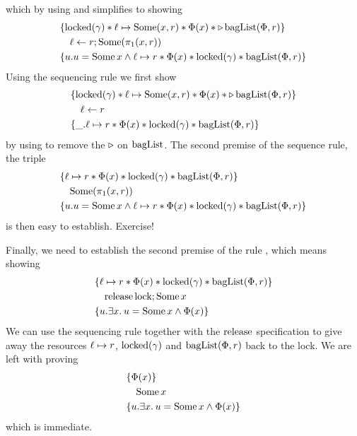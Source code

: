 \begin{example}
  which by using  and  simplifies to showing
  \begin{align*}
    \hoareV{\locked(\gamma) \ast \ell \pointsto \Some(x, r) \ast \Phi(x) \ast \later \baglist(\Phi,r)}{\ell \gets r ; \Some(\pi_1 (x,r))}{u.u = \Some x \land \ell \pointsto r \ast \Phi(x) \ast \locked(\gamma) \ast \baglist(\Phi,r)}
  \end{align*}
  Using the sequencing rule we first show
  \begin{align*}
    \hoareV{\locked(\gamma) \ast \ell \pointsto \Some(x, r) \ast \Phi(x) \ast \later \baglist(\Phi,r)}{\ell \gets r }{\_. \ell \pointsto r \ast \Phi(x) \ast \locked(\gamma) \ast \baglist(\Phi,r)}
  \end{align*}
  by using  to remove the $\mathop{{\triangleright}}$ on $\operatorname{bagList}$.
  The second premise of the sequence rule, the triple
  \begin{align*}
    \hoareV{\ell \pointsto r \ast \Phi(x) \ast \locked(\gamma) \ast \baglist(\Phi,r)}
    {\Some (\pi_1(x, r))}
    {u.u = \Some x \land \ell \pointsto r \ast \Phi(x) \ast \locked(\gamma) \ast \baglist(\Phi,r)}
  \end{align*}
  is then easy to establish. Exercise!

  Finally, we need to establish the second premise of the rule , which means showing
  \begin{align*}
    \hoareV{\ell \pointsto r \ast \Phi(x) \ast \locked(\gamma) \ast \baglist(\Phi,r)}
    {\release \lock ; \Some x}
    {u.\Exists x. u = \Some x \land \Phi(x)}
  \end{align*}
  We can use the sequencing rule together with the $\operatorname{release}$ specification to give away the resources $\ell \mapsto r$, $\operatorname{locked}(\gamma)$ and $\operatorname{bagList}(\Phi,r)$ back to the lock.
  We are left with proving
  \begin{align*}
    \hoareV{\Phi(x)}
    {\Some x}
    {u.\Exists x. u = \Some x \land \Phi(x)}
  \end{align*}
  which is immediate.


\end{example}
